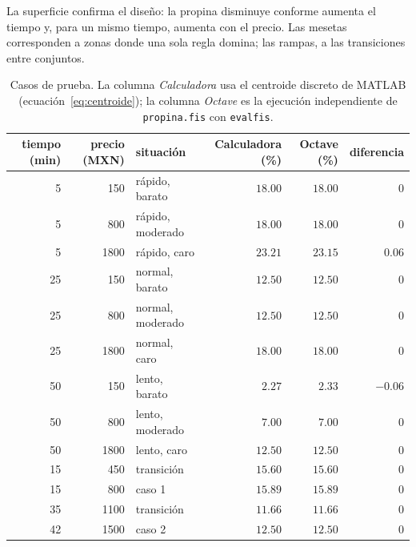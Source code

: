 \documentclass[11pt,letterpaper]{article}
\begin{document}
La superficie confirma el diseño: la propina disminuye conforme aumenta el tiempo y, para un mismo tiempo, aumenta con el precio. Las mesetas corresponden a zonas donde una sola regla domina; las rampas, a las transiciones entre conjuntos.

\begin{table}[H]
\centering
\small
\caption{Casos de prueba. La columna \emph{Calculadora} usa el centroide discreto de MATLAB (ecuación~\ref{eq:centroide}); la columna \emph{Octave} es la ejecución independiente de \texttt{propina.fis} con \texttt{evalfis}.}
\label{tab:casos}
\begin{tabular}{rrlrrr}
\toprule
tiempo (min) & precio (MXN) & situación & Calculadora (\%) & Octave (\%) & diferencia \\
\midrule
5 & 150 & rápido, barato & $18.00$ & $18.00$ & $0$ \\
5 & 800 & rápido, moderado & $18.00$ & $18.00$ & $0$ \\
5 & 1800 & rápido, caro & $23.21$ & $23.15$ & $0.06$ \\
25 & 150 & normal, barato & $12.50$ & $12.50$ & $0$ \\
25 & 800 & normal, moderado & $12.50$ & $12.50$ & $0$ \\
25 & 1800 & normal, caro & $18.00$ & $18.00$ & $0$ \\
50 & 150 & lento, barato & $2.27$ & $2.33$ & $-0.06$ \\
50 & 800 & lento, moderado & $7.00$ & $7.00$ & $0$ \\
50 & 1800 & lento, caro & $12.50$ & $12.50$ & $0$ \\
15 & 450 & transición & $15.60$ & $15.60$ & $0$ \\
15 & 800 & caso 1 & $15.89$ & $15.89$ & $0$ \\
35 & 1100 & transición & $11.66$ & $11.66$ & $0$ \\
42 & 1500 & caso 2 & $12.50$ & $12.50$ & $0$ \\
\bottomrule
\end{tabular}
\end{table}
\end{document}
